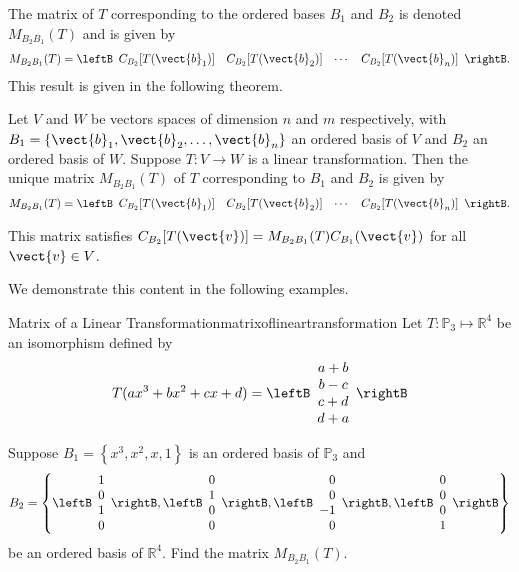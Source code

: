 The matrix of $T$ corresponding to the ordered
bases $B_1$ and $B_2$ is denoted $ M_{B_2B_1}(T)$ and is given by 
\[ M_{B_2B_1}(T)=
\leftB\begin{array}{cccc}
C_{B_2} [ T(\vect{b}_1)] & C_{B_2}[T(\vect{b}_2) ] &
\cdots & C_{B_2}[T(\vect{b}_n) ] \end{array}\rightB.\] 
This result is given in the following theorem. 

\begin{theorem}{}{}
Let $V$ and $W$ be vectors spaces of dimension
$n$ and $m$ respectively, with $B_1=\{\vect{b}_1, \vect{b}_2, \ldots, \vect{b}_n\}$ an
ordered basis of $V$ and $B_2$ an ordered basis of $W$. Suppose $T:V\to W$ is a linear transformation. Then the unique matrix $M_{B_2B_1}(T)$ of $T$ corresponding to $B_1$ and $B_2$ is given by 
\[ M_{B_2B_1}(T)=
\leftB\begin{array}{cccc}
C_{B_2}[T(\vect{b}_1)] & C_{B_2}[T(\vect{b}_2)] &
\cdots & C_{B_2}[T(\vect{b}_n)] \end{array}\rightB.\]

This matrix satisfies  $C_{B_2}[T(\vect{v})]=M_{B_2B_1}(T)C_{B_1}(\vect{v})$ for all $\vect{v}\in V$.
\end{theorem}

We demonstrate this content in the following examples. 

\begin{example}{Matrix of a Linear Transformation}{matrixoflineartransformation}
Let $T: \mathbb{P}_3 \mapsto \mathbb{R}^4$ be an isomorphism defined by
\[
T( ax^3 + bx^2 + cx + d) = \leftB \begin{array}{c}
a + b \\
b - c \\
c + d \\
d + a 
\end{array} \rightB
\]

Suppose $B_1 = \left\{ x^3, x^2, x, 1 \right\}$ is an ordered basis of $\mathbb{P}_3$ and 
\[
B_2 = \left\{ \leftB \begin{array}{r}
1 \\
0 \\
1 \\
0
\end{array} \rightB, \leftB \begin{array}{r}
0 \\
1 \\
0 \\
0
\end{array} \rightB, 
\leftB \begin{array}{r}
0 \\
0 \\
-1 \\
0
\end{array} \rightB, 
\leftB \begin{array}{r}
0 \\
0 \\
0 \\
1
\end{array} \rightB \right\} 
\]
be an ordered basis of $\mathbb{R}^4$.
Find the matrix $M_{B_2B_1}(T)$. 
\end{example}

